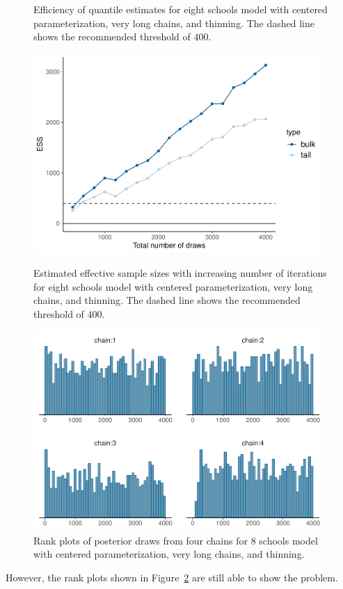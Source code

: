 \documentclass[american,]{article}
\theoremstyle{definition}
\begin{document}
\begin{figure}[tp]
\begin{minipage}{0.48\textwidth}
  \caption{Efficiency of quantile estimates for eight schools model with 
  centered parameterization, very long chains, and thinning. The dashed line shows the
    recommended threshold of $400$.}
  \label{fig:quantile-ess-fit-cp4-tau-1}
\end{minipage}
\end{figure}
\begin{figure}[tp]
  \centering
  \begin{minipage}{0.48\textwidth}
  \includegraphics[width=0.98\textwidth]{graphics/change-ess-fit-cp4-tau-1.pdf}
  \caption{Estimated effective sample sizes with increasing number of 
  iterations for eight schools model with centered parameterization, very 
  long chains, and thinning. The dashed line shows the
    recommended threshold of $400$.}
  \label{fig:change-ess-fit-cp4-tau-1}
\end{minipage}
\hfill
  \begin{minipage}{0.48\textwidth}
  \includegraphics[width=0.98\textwidth]{graphics/hist-fit-cp4-tau-1.pdf}
  \caption{Rank plots of posterior draws from four chains for 8
    schools model with centered parameterization, very long chains, and
    thinning.}
  \label{fig:hist-fit-cp4-tau-1}
\end{minipage}
\end{figure}
However, the rank plots shown in Figure~\ref{fig:hist-fit-cp4-tau-1}
are still able to show the problem.
\end{document}
